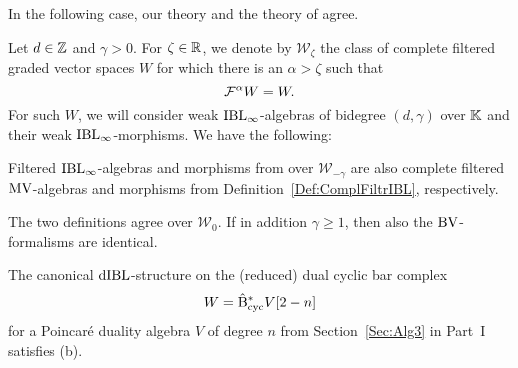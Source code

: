 \documentclass[\MainFolder/Text.tex]{subfiles}
\begin{document}
In the following case, our theory and the theory of \cite{Cieliebak2015} agree.

\begin{Proposition}\label{Prop:BVforIBL}
Let $d\in \mathbb{Z}$ and $\gamma>0$. For $\zeta\in \mathbb{R}$, we denote by $\mathcal{W}_\zeta$ the class of complete filtered graded vector spaces $W$ for which there is an $\alpha>\zeta$ such that
\begin{equation}\label{Eq:FiltrCondU}
 \mathcal{F}^{\alpha} W = W.
\end{equation}
For such $W$, we will consider weak $\mathrm{IBL}_\infty$-algebras of bidegree $(d,\gamma)$ over $\mathbb{K}$ and their weak $\mathrm{IBL}_\infty$-morphisms. We have the following:
\begin{ClaimList}
\item Filtered $\mathrm{IBL}_\infty$-algebras and morphisms from \cite{Cieliebak2015} over $\mathcal{W}_{-\gamma}$ are also complete filtered $\mathrm{MV}$-algebras and morphisms from Definition~\ref{Def:ComplFiltrIBL}, respectively.
\item The two definitions agree over $\mathcal{W}_0$. If in addition $\gamma\ge 1$, then also the $\mathrm{BV}$-formalisms are identical.
\item The canonical $\mathrm{dIBL}$-structure on the (reduced) dual cyclic bar complex 
$$W = \hat{\mathrm{B}}_{\mathrm{cyc}}^* V[2-n]$$
for a Poincar\'e duality algebra $V$ of degree $n$ from Section~\ref{Sec:Alg3} in Part~I satisfies (b).
\end{ClaimList}
%
\end{Proposition}
\end{document}
